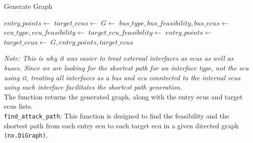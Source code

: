 \begin{algorithm}[h]
    \caption{Generate Graph}
    \label{alg:generate_graph}
    \begin{algorithmic}[1]
        \State $entry\_points \gets$ 
        \State $target\_ecus \gets$ 
        \State $G \gets$ 
            \State $bus\_type, bus\_feasibility, bus\_ecus \gets$ 
                \State $ecu\_type, ecu\_feasibility \gets$ 
                    \State {}
                \EndIf
                    \State {}
                \EndIf
                        \State {}
                    \Else
                        \State $target\_ecu\_feasibility \gets$ 
                        \State {}
                    \EndIf
                \EndFor
            \EndFor
        \EndFor
        \State $entry\_points \gets$ 
        \State $target\_ecus \gets$ 
        \State \Return $G, entry\_points, target\_ecus$
    \EndProcedure
    \end{algorithmic}
\end{algorithm}

\textit{Note: This is why it was easier to treat external interfaces as \acrshort{ecu}s as well as buses.
Since we are looking for the shortest path for an interface type, not the \acrshort{ecu} using it, treating all interfaces
as a bus and \acrshort{ecu} conntected to the internal \acrshort{ecu}s using such interface facilitates the shortest path generation.}\\
The function returns the generated graph, along with the entry \acrshort{ecu}s and target \acrshort{ecu}s lists.\\


\texttt{find\_attack\_path}: 
This function is designed to find the feasibility and the shortest path from each entry \acrshort{ecu} 
to each target \acrshort{ecu} in a given directed graph \texttt{(nx.DiGraph)}.

